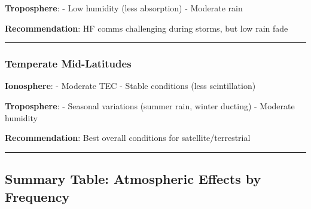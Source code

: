 \textbf{Troposphere}: - Low humidity (less absorption) - Moderate rain

\textbf{Recommendation}: HF comms challenging during storms, but low
rain fade

\begin{center}\rule{0.5\linewidth}{0.5pt}\end{center}

\subsubsection{Temperate Mid-Latitudes}\label{temperate-mid-latitudes}

\textbf{Ionosphere}: - Moderate TEC - Stable conditions (less
scintillation)

\textbf{Troposphere}: - Seasonal variations (summer rain, winter
ducting) - Moderate humidity

\textbf{Recommendation}: Best overall conditions for
satellite/terrestrial

\begin{center}\rule{0.5\linewidth}{0.5pt}\end{center}

\subsection{Summary Table: Atmospheric Effects by
Frequency}\label{summary-table-atmospheric-effects-by-frequency}

